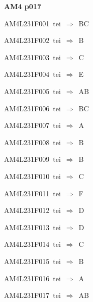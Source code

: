 \par\vfill\eject
{\bf\hfill AM4 p017\hfill\hbox{}}\par\bigskip
{\sixrm AM4L231F001\ {\sixit tei}\ }$\Rightarrow$\ BC\par\smallskip
{\sixrm AM4L231F002\ {\sixit tei}\ }$\Rightarrow$\ B\par\smallskip
{\sixrm AM4L231F003\ {\sixit tei}\ }$\Rightarrow$\ C\par\smallskip
{\sixrm AM4L231F004\ {\sixit tei}\ }$\Rightarrow$\ E\par\smallskip
{\sixrm AM4L231F005\ {\sixit tei}\ }$\Rightarrow$\ AB\par\smallskip
{\sixrm AM4L231F006\ {\sixit tei}\ }$\Rightarrow$\ BC\par\smallskip
{\sixrm AM4L231F007\ {\sixit tei}\ }$\Rightarrow$\ A\par\smallskip
{\sixrm AM4L231F008\ {\sixit tei}\ }$\Rightarrow$\ B\par\smallskip
{\sixrm AM4L231F009\ {\sixit tei}\ }$\Rightarrow$\ B\par\smallskip
{\sixrm AM4L231F010\ {\sixit tei}\ }$\Rightarrow$\ C\par\smallskip
{\sixrm AM4L231F011\ {\sixit tei}\ }$\Rightarrow$\ F\par\smallskip
{\sixrm AM4L231F012\ {\sixit tei}\ }$\Rightarrow$\ D\par\smallskip
{\sixrm AM4L231F013\ {\sixit tei}\ }$\Rightarrow$\ D\par\smallskip
{\sixrm AM4L231F014\ {\sixit tei}\ }$\Rightarrow$\ C\par\smallskip
{\sixrm AM4L231F015\ {\sixit tei}\ }$\Rightarrow$\ B\par\smallskip
{\sixrm AM4L231F016\ {\sixit tei}\ }$\Rightarrow$\ A\par\smallskip
{\sixrm AM4L231F017\ {\sixit tei}\ }$\Rightarrow$\ AB\par\smallskip

